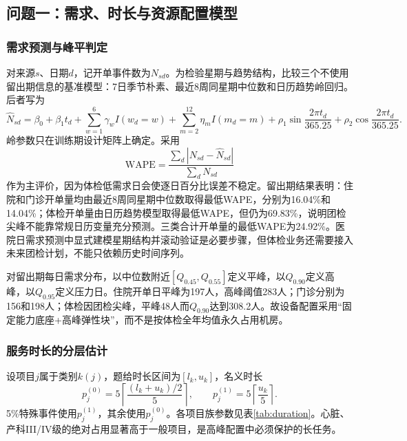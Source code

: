 \subsection{问题一：需求、时长与资源配置模型}

\subsubsection{需求预测与峰平判定}

对来源$s$、日期$d$，记开单事件数为$N_{sd}$。为检验星期与趋势结构，比较三个不使用留出期信息的基准模型：7日季节朴素、最近8周同星期中位数和日历趋势岭回归。后者写为
\begin{equation}
  \widehat N_{sd}=\beta_0+\beta_1 t_d+\sum_{w=1}^{6}\gamma_w I(w_d=w)
  +\sum_{m=2}^{12}\eta_m I(m_d=m)+\rho_1\sin\frac{2\pi t_d}{365.25}
  +\rho_2\cos\frac{2\pi t_d}{365.25}.
\end{equation}
岭参数只在训练期设计矩阵上确定。采用
\begin{equation}
 \mathrm{WAPE}=\frac{\sum_d|N_{sd}-\widehat N_{sd}|}{\sum_dN_{sd}}
\end{equation}
作为主评价，因为体检低需求日会使逐日百分比误差不稳定。留出期结果表明：住院和门诊开单量均由最近8周同星期中位数取得最低WAPE，分别为16.04\%和14.04\%；体检开单量由日历趋势模型取得最低WAPE，但仍为69.83\%，说明团检尖峰不能靠常规日历变量充分预测。三类合计开单量的最低WAPE为24.92\%。医院日需求预测中显式建模星期结构并滚动验证是必要步骤\cite{luo2017,lin2019}，但体检业务还需要接入未来团检计划，不能只依赖历史时间序列。

对留出期每日需求分布，以中位数附近$[Q_{0.45},Q_{0.55}]$定义平峰，以$Q_{0.90}$定义高峰，以$Q_{0.95}$定义压力日。住院开单日平峰为197人，高峰阈值283人；门诊分别为156和198人；体检因团检尖峰，平峰48人而$Q_{0.90}$达到308.2人。故设备配置采用“固定能力底座+高峰弹性块”，而不是按体检全年均值永久占用机房。

\subsubsection{服务时长的分层估计}

设项目$j$属于类别$k(j)$，题给时长区间为$[l_k,u_k]$，名义时长
\begin{equation}
  p_j^{(0)}=5\left\lceil\frac{(l_k+u_k)/2}{5}\right\rceil,
  \qquad
  p_j^{(1)}=5\left\lceil\frac{u_k}{5}\right\rceil.
\end{equation}
5\%特殊事件使用$p_j^{(1)}$，其余使用$p_j^{(0)}$。各项目族参数见表\ref{tab:duration}。心脏、产科III/IV级的绝对占用显著高于一般项目，是高峰配置中必须保护的长任务。

